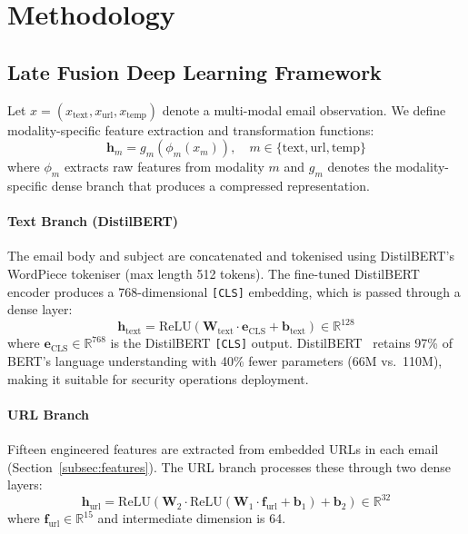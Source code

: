 \documentclass[conference]{IEEEtran}
\begin{document}
\section{Methodology}
\label{sec:methodology}

\subsection{Late Fusion Deep Learning Framework}
\label{subsec:fusion_formalism}

Let $x = (x_{\text{text}}, x_{\text{url}}, x_{\text{temp}})$ denote a
multi-modal email observation. We define modality-specific feature extraction
and transformation functions:
\begin{equation}
  \mathbf{h}_m = g_m(\phi_m(x_m)), \quad m \in \{\text{text}, \text{url}, \text{temp}\}
  \label{eq:feature_extraction}
\end{equation}
where $\phi_m$ extracts raw features from modality $m$ and $g_m$ denotes the
modality-specific dense branch that produces a compressed representation.

\paragraph{Text Branch (DistilBERT)}
The email body and subject are concatenated and tokenised using DistilBERT's
WordPiece tokeniser (max length 512 tokens). The fine-tuned DistilBERT
encoder produces a 768-dimensional \texttt{[CLS]} embedding, which is passed
through a dense layer:
\begin{equation}
  \mathbf{h}_{\text{text}} = \text{ReLU}(\mathbf{W}_{\text{text}} \cdot \mathbf{e}_{\text{CLS}} + \mathbf{b}_{\text{text}}) \in \mathbb{R}^{128}
  \label{eq:text_branch}
\end{equation}
where $\mathbf{e}_{\text{CLS}} \in \mathbb{R}^{768}$ is the DistilBERT
\texttt{[CLS]} output. DistilBERT~\cite{sanh2019} retains 97\% of BERT's
language understanding with 40\% fewer parameters (66M vs.\ 110M), making
it suitable for security operations deployment.

\paragraph{URL Branch}
Fifteen engineered features are extracted from embedded URLs in each email
(Section~\ref{subsec:features}). The URL branch processes these through
two dense layers:
\begin{equation}
  \mathbf{h}_{\text{url}} = \text{ReLU}(\mathbf{W}_2 \cdot \text{ReLU}(\mathbf{W}_1 \cdot \mathbf{f}_{\text{url}} + \mathbf{b}_1) + \mathbf{b}_2) \in \mathbb{R}^{32}
  \label{eq:url_branch}
\end{equation}
where $\mathbf{f}_{\text{url}} \in \mathbb{R}^{15}$ and intermediate
dimension is 64.
\end{document}
